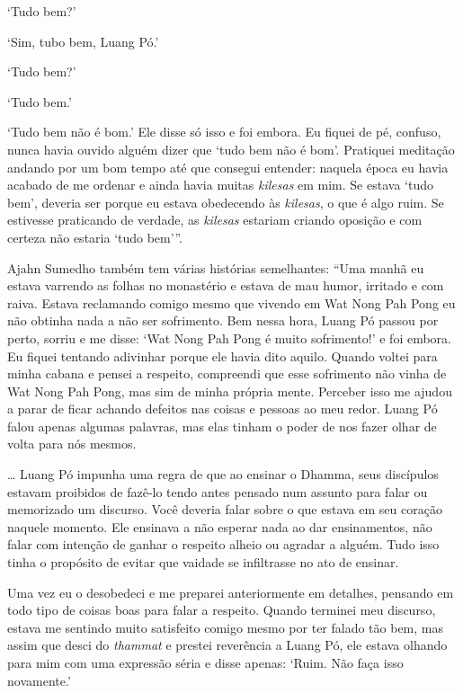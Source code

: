 `Tudo bem?'

`Sim, tubo bem, Luang Pó.'

`Tudo bem?'

`Tudo bem.'

`Tudo bem não é bom.' Ele disse só isso e foi embora. Eu fiquei de pé,
confuso, nunca havia ouvido alguém dizer que `tudo bem não é bom'.
Pratiquei meditação andando por um bom tempo até que consegui entender:
naquela época eu havia acabado de me ordenar e ainda havia muitas
\emph{kilesas} em mim. Se estava `tudo bem', deveria ser porque eu
estava obedecendo às \emph{kilesas}, o que é algo ruim. Se estivesse
praticando de verdade, as \emph{kilesas} estariam criando oposição e com
certeza não estaria `tudo bem'''.

Ajahn Sumedho também tem várias histórias semelhantes: ``Uma manhã eu
estava varrendo as folhas no monastério e estava de mau humor, irritado
e com raiva. Estava reclamando comigo mesmo que vivendo em Wat Nong Pah
Pong eu não obtinha nada a não ser sofrimento. Bem nessa hora, Luang Pó
passou por perto, sorriu e me disse: `Wat Nong Pah Pong é muito
sofrimento!' e foi embora. Eu fiquei tentando adivinhar porque ele havia
dito aquilo. Quando voltei para minha cabana e pensei a respeito,
compreendi que esse sofrimento não vinha de Wat Nong Pah Pong, mas sim
de minha própria mente. Perceber isso me ajudou a parar de ficar achando
defeitos nas coisas e pessoas ao meu redor. Luang Pó falou apenas
algumas palavras, mas elas tinham o poder de nos fazer olhar de volta
para nós mesmos.

\ldots{} Luang Pó impunha uma regra de que ao ensinar o Dhamma, seus
discípulos estavam proibidos de fazê-lo tendo antes pensado num assunto
para falar ou memorizado um discurso. Você deveria falar sobre o que
estava em seu coração naquele momento. Ele ensinava a não esperar nada
ao dar ensinamentos, não falar com intenção de ganhar o respeito alheio
ou agradar a alguém. Tudo isso tinha o propósito de evitar que vaidade
se infiltrasse no ato de ensinar.

Uma vez eu o desobedeci e me preparei anteriormente em detalhes,
pensando em todo tipo de coisas boas para falar a respeito. Quando
terminei meu discurso, estava me sentindo muito satisfeito comigo mesmo
por ter falado tão bem, mas assim que desci do \emph{thammat} e prestei
reverência a Luang Pó, ele estava olhando para mim com uma expressão
séria e disse apenas: `Ruim. Não faça isso novamente.'

